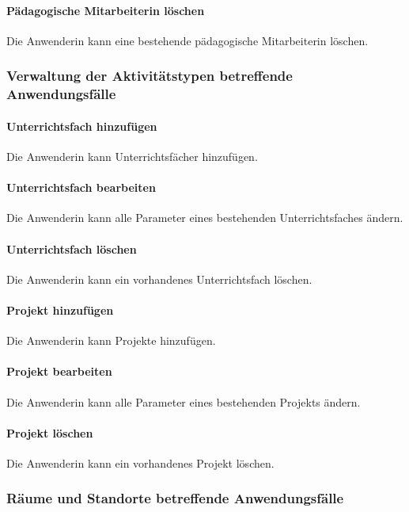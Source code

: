 \documentclass[fontsize=12pt,paper=a4,twoside]{scrartcl}
\begin{document}
\paragraph{Pädagogische Mitarbeiterin löschen}
Die Anwenderin kann eine bestehende pädagogische Mitarbeiterin löschen.



\subsubsection{Verwaltung der Aktivitätstypen betreffende Anwendungsfälle}

\paragraph{Unterrichtsfach hinzufügen}
Die Anwenderin kann Unterrichtsfächer hinzufügen.

\paragraph{Unterrichtsfach bearbeiten}
Die Anwenderin kann alle Parameter eines bestehenden Unterrichtsfaches ändern.

\paragraph{Unterrichtsfach löschen}
Die Anwenderin kann ein vorhandenes Unterrichtsfach löschen.

\paragraph{Projekt hinzufügen}
Die Anwenderin kann Projekte hinzufügen.

\paragraph{Projekt bearbeiten}
Die Anwenderin kann alle Parameter eines bestehenden Projekts ändern.

\paragraph{Projekt löschen}
Die Anwenderin kann ein vorhandenes Projekt löschen.



\subsubsection{Räume und Standorte betreffende Anwendungsfälle}
\end{document}
